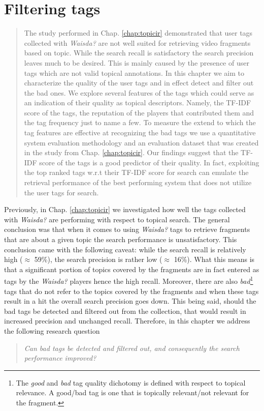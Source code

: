 \chapter{Filtering tags}
\begin{quotation}
\noindent
The study performed in Chap. \ref{chap:topicir} demonstrated that user tags collected with \textit{Waisda?} are not well suited for retrieving video fragments based on topic. While the search recall is satisfactory the search precision leaves much to be desired. This is mainly caused by the presence of user tags which are not valid topical annotations. In this chapter we aim to characterize the quality of the user tags and in effect detect and filter out the bad ones. We explore several features of the tags which could serve as an indication of their quality as topical descriptors. Namely, the TF-IDF score of the tags, the reputation of the players that contributed them and the tag frequency just to name a few. To measure the extend to which the tag features are effective at recognizing the bad tags we use a quantitative system evaluation methodology and an evaluation dataset that was created in the study from Chap. \ref{chap:topicir}. Our findings suggest that the TF-IDF score of the tags is a good predictor of their quality. In fact, exploiting the top ranked tags w.r.t their TF-IDF score for search can emulate the retrieval performance of the best performing system that does not utilize the user tags for search. 
\end{quotation}

Previously, in Chap. \ref{chap:topicir} we investigated how well the tags collected with \textit{Waisda?} are performing with respect to topical search. The general conclusion was that when it comes to using \textit{Waisda?} tags to retrieve fragments that are about a given topic the search performance is  unsatisfactory. This conclusion came with the following caveat: while the search recall is relatively high ($\approx$ 59\%), the search precision is rather low ($\approx$ 16\%). What this means is that a significant portion of topics covered by the fragments are in fact entered as tags by the \textit{Waisda?} players hence the high recall. Moreover, there are also \textit{bad}\footnote{The \textit{good} and \textit{bad} tag quality dichotomy is defined with respect to topical relevance. A good/bad tag is one that is topically relevant/not relevant for the fragment.} tags that do not refer to the topics covered by the fragments and when these tags result in a hit the overall search precision goes down. This being said, should the bad tags be detected and filtered out from the collection, that would result in increased precision and unchanged recall. Therefore, in this chapter we address the following research question
\begin{quote}
\textit{Can bad tags be detected and filtered out, and consequently the search performance improved?}
\end{quote} 

